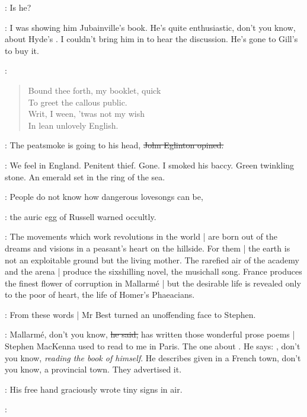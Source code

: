 \eglinton:
Is he?

\best:
I was showing him Jubainville's book.
He's quite enthusiastic,
don't you know,
about Hyde's .
I couldn't bring him in to hear the discussion.
He's gone to Gill's to buy it.

\StephenInt:
\begin{verse}
    Bound thee forth, my booklet, quick \\
    To greet the callous public. \\
    Writ, I ween, 'twas not my wish \\
    In lean unlovely English.
\end{verse}

\eglinton:
The peatsmoke is going to his head,
\sout{John Eglinton opined.}

\StephenInt:
We feel in England.
Penitent thief.
Gone.
I smoked his baccy.
Green twinkling stone.
An emerald set in the ring of the sea.

\AErussell:
People do not know how dangerous lovesongs can be,

:
the auric egg of Russell warned occultly.

\AErussell:
The movements which work revolutions in the world |
are born out of the dreams and visions in a peasant's heart on the hillside.
For them |
the earth is not an exploitable ground but the living mother.
The rarefied air of the academy and the arena |
produce the sixshilling novel,
the musichall song.
France produces the finest flower of corruption in Mallarmé |
but the desirable life is revealed only to the poor of heart,
the life of Homer's Phaeacians.

:
From these words |
Mr Best turned an unoffending face to Stephen.

\best:
Mallarmé,
don't you know,
\sout{he said,}
has written those wonderful prose poems |
Stephen MacKenna used to read to me in Paris.
The one about .
He says:
,
don't you know,
\emph{reading the book of himself}.
He describes  given in a French town,
don't you know,
a provincial town.
They advertised it.

:
His free hand graciously wrote tiny signs in air.

\best:
\begin{verse}
\end{verse}

